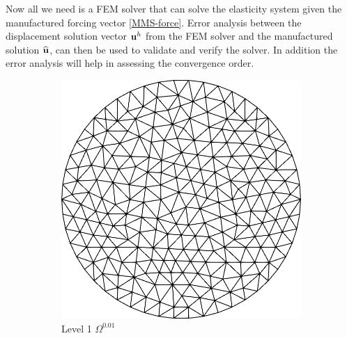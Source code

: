 \begin{itemize}
Now all we need is a FEM solver that can solve the elasticity system given the manufactured forcing vector \eqref{MMS-force}. Error analysis between the displacement solution vector ${\bf{u}}^h$ from the FEM solver and the manufactured solution $\widehat{\textbf{u}}$, can then be used to validate and verify the solver. In addition the error analysis will help in assessing the convergence order.  

\end{itemize}

 \begin{figure}[t]
 \centering
 \begin{subfigure}[t]{.23\linewidth}
 \includegraphics[width=1\textwidth]{./Images/M0.png}
 \caption{Level 1 $\Omega^{0.01}$}
 \end{subfigure}\hfill
  \begin{subfigure}[t]{.23\linewidth}

\end{subfigure}
\end{figure}
